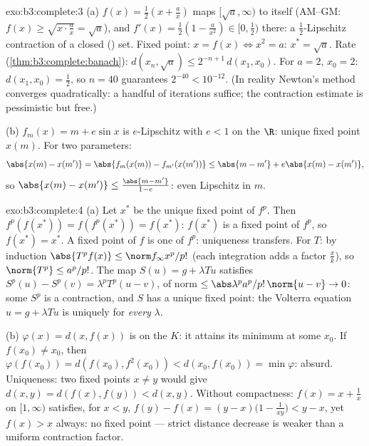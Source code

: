 \begin{solution}{exo:b3:complete:3}
(a) $f(x) = \frac12(x + \frac ax)$ maps $[\sqrt a, \infty)$ to
itself (AM--GM: $f(x) \geq \sqrt{x \cdot \frac ax} = \sqrt a$),
and $f'(x) = \frac12(1 - \frac a{x^2}) \in [0, \frac12)$ there:
a $\frac12$-Lipschitz contraction of a closed () set.
Fixed point: $x = f(x) \iff x^2 = a$: $x^* = \sqrt a$. Rate
(\cref{thm:b3:complete:banach}): $d(x_n, \sqrt a) \leq
2^{-n+1}\,d(x_1, x_0)$. For $a = 2$, $x_0 = 2$: $d(x_1, x_0) =
\frac12$, so $n = 40$ guarantees $2^{-40} < 10^{-12}$. (In
reality Newton's method converges quadratically: a handful of
iterations suffice; the contraction estimate is pessimistic but
free.)

(b) $f_m(x) = m + e\sin x$ is $e$-Lipschitz with $e < 1$ on the
 $\R$: unique fixed point $x(m)$. For two parameters:
\[
\abs{x(m) - x(m')} = \abs{f_m(x(m)) - f_{m'}(x(m'))}
\leq \abs{m - m'} + e\abs{x(m) - x(m')},
\]
so $\abs{x(m) - x(m')} \leq \frac{\abs{m - m'}}{1 - e}$: even
Lipschitz in $m$.
\end{solution}

\begin{solution}{exo:b3:complete:4}
(a) Let $x^*$ be the unique fixed point of $f^p$. Then
$f^p(f(x^*)) = f(f^p(x^*)) = f(x^*)$: $f(x^*)$ is a fixed point
of $f^p$, so $f(x^*) = x^*$. A fixed point of $f$ is one of
$f^p$: uniqueness transfers. For $T$: by induction $\abs{T^pf(x)}
\leq \norm f_\infty x^p/p!$ (each integration adds a factor
$\frac xk$), so $\norm{T^p} \leq a^p/p!$. The map $S(u) = g +
\lambda Tu$ satisfies $S^p(u) - S^p(v) = \lambda^pT^p(u - v)$,
of norm $\leq \abs\lambda^pa^p/p!\,\norm{u - v} \to 0$: some
$S^p$ is a contraction, and $S$ has a unique fixed point: the
Volterra equation $u = g + \lambda Tu$ is uniquely  for
\emph{every} $\lambda$.

(b) $\varphi(x) = d(x, f(x))$ is  on the  $K$:
it attains its minimum at some $x_0$. If $f(x_0) \neq x_0$,
then $\varphi(f(x_0)) = d(f(x_0), f^2(x_0)) < d(x_0, f(x_0)) =
\min\varphi$: absurd. Uniqueness: two fixed points $x \ne y$
would give $d(x,y) = d(f(x), f(y)) < d(x,y)$. Without
compactness: $f(x) = x + \frac1x$ on $[1, \infty)$ satisfies,
for $x < y$, $f(y) - f(x) = (y - x)\bigl(1 - \frac1{xy}\bigr) <
y - x$, yet $f(x) > x$ always: no fixed point --- strict
distance decrease is weaker than a uniform contraction factor.
\end{solution}

